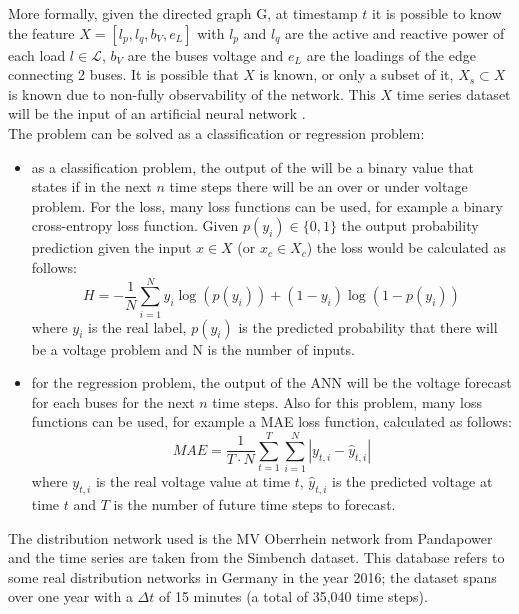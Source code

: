 More formally, given the directed graph \gls{G}, at timestamp $t$ it is possible to know the feature $X=[l_p,l_q,b_V,e_L]$ with $l_p$ and $l_q$ are the active and reactive power of each load $l \in \mathcal{L}$, $b_V$ are the buses voltage and $e_L$ are the loadings of the edge connecting 2 buses. It is possible that $X$ is known, or only a subset of it, $X_s \subset X$ is known due to non-fully observability of the network. This $X$ time series dataset will be the input of an artificial neural network .\\
The problem can be solved as a classification or regression problem: 
\begin{itemize}
    \item as a classification problem, the output of the  will be a binary value that states if in the next $n$ time steps there will be an over or under voltage problem. For the loss, many loss functions can be used, for example a binary cross-entropy loss function. Given $p(y_i) \in \{0,1\}$ the output probability prediction given the input $x \in X$ (or $x_c \in X_c$) the loss would be calculated as follows: 
    \[
    H = - \frac{1}{N} \sum_{i=1}^{N} y_i \log{(p(y_i))} + (1 - y_i) \log{(1 - p(y_i))} 
    \]
    where $y_i$ is the real label, $p(y_i)$ is the predicted probability that there will be a voltage problem and N is the number of inputs.
    \item for the regression problem, the output of the \gls{ANN} will be the voltage forecast for each buses for the next $n$ time steps. Also for this problem, many loss functions can be used, for example a \gls{MAE} loss function, calculated as follows:
    \[
    MAE = \frac{1}{T \cdot N} \sum_{t=1}^{T} \sum_{i=1}^{N} |y_{t,i} - \hat{y}_{t,i}|
    \]
    where $y_{t,i}$ is the real voltage value at time $t$, $\hat{y}_{t,i}$ is the predicted voltage at time $t$ and $T$ is the number of future time steps to forecast.
\end{itemize}

The distribution network used is the MV Oberrhein network from Pandapower and the time series are taken from the Simbench dataset. This database refers to some real distribution networks in Germany in the year 2016; the dataset spans over one year with a $\Delta t$ of 15 minutes (a total of 35,040 time steps).

